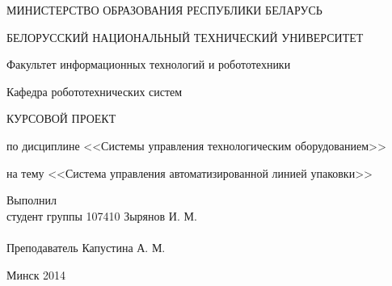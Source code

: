 \begin{titlepage} %

\thispagestyle{empty} %

\begin{center}
МИНИСТЕРСТВО ОБРАЗОВАНИЯ РЕСПУБЛИКИ БЕЛАРУСЬ

БЕЛОРУССКИЙ НАЦИОНАЛЬНЫЙ ТЕХНИЧЕСКИЙ УНИВЕРСИТЕТ

Факультет информационных технологий и робототехники

Кафедра робототехнических систем
\end{center}

\vfill

\begin{center}
    \large{КУРСОВОЙ ПРОЕКТ}

    \normalsize{по дисциплине <<Системы управления технологическим оборудованием>>}

    \normalsize{на тему <<Система управления автоматизированной линией упаковки>>}
\end{center}

\vfill

\noindent
Выполнил\\
студент группы 107410 \hfill Зырянов И. М.
\\
\\
\noindent
Преподаватель \hfill Капустина А. М.

\vfill

\centerline{Минск 2014}

\clearpage %

\end{titlepage}





